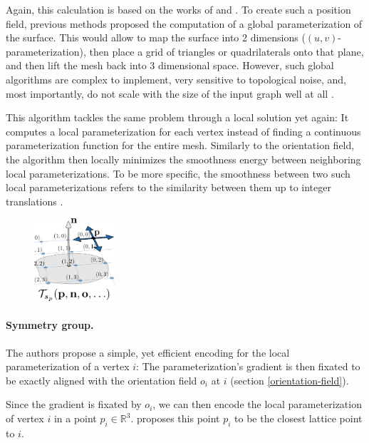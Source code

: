 \documentclass{ACGSeminar}
\begin{document}
Again, this calculation is based on the works of \cite{bommes2009mixed} and \cite{ray2006periodic}. To create such a position field, previous methods proposed the computation of a global parameterization of the surface. This would allow to map the surface into 2 dimensions ($(u,v)$-parameterization), then place a grid of triangles or quadrilaterals onto that plane, and then lift the mesh back into 3 dimensional space. However, such global algorithms are complex to implement, very sensitive to topological noise, and, most importantly, do not scale with the size of the input graph well at all \cite{jakob2015instant}.\bigskip

This algorithm tackles the same problem through a local solution yet again: It computes a local parameterization for each vertex instead of finding a continuous parameterization function for the entire mesh. Similarly to the orientation field, the algorithm then locally minimizes the smoothness energy between neighboring local parameterizations. To be more specific, the smoothness between two such local parameterizations refers to the similarity between them up to integer translations \cite{jakob2015instant}.

\begin{figure}
	\includegraphics[width=3cm]{img/integer-translation.png}\par
	\label{fig:integer-translation}
\end{figure}

\paragraph{Symmetry group.}
The authors propose a simple, yet efficient encoding for the local parameterization of a vertex $i$: The parameterization's gradient is then fixated to be exactly aligned with the orientation field $o_i$ at $i$ (section \ref{orientation-field}).

Since the gradient is fixated by $o_i$, we can then encode the local parameterization of vertex $i$ in a point $p_i \in \mathbb{R}^3$. \cite{jakob2015instant} proposes this point $p_i$ to be the closest lattice point to $i$.
\end{document}
